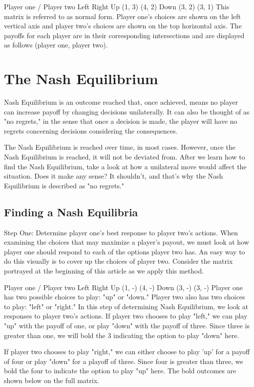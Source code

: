 Player one / Player two	Left	Right
Up	(1, 3)	(4, 2)
Down	(3, 2)	(3, 1)
This matrix is referred to as normal form. Player one's choices are shown on the left vertical axis and player two's choices are shown on the top horizontal axis. The payoffs for each player are in their corresponding intersections and are displayed as follows (player one, player two).

\section{The Nash Equilibrium}
Nash Equilibrium is an outcome reached that, once achieved, means no player can increase payoff by changing decisions unilaterally. It can also be thought of as "no regrets," in the sense that once a decision is made, the player will have no regrets concerning decisions considering the consequences.

The Nash Equilibrium is reached over time, in most cases. However, once the Nash Equilibrium is reached, it will not be deviated from. After we learn how to find the Nash Equilibrium, take a look at how a unilateral move would affect the situation. Does it make any sense? It shouldn't, and that's why the Nash Equilibrium is described as "no regrets."

\subsection{Finding a Nash Equilibria}
Step One: Determine player one's best response to player two's actions.
When examining the choices that may maximize a player's payout, we must look at how player one should respond to each of the options player two has. An easy way to do this visually is to cover up the choices of player two. Consider the matrix portrayed at the beginning of this article as we apply this method.

Player one / Player two	Left	Right
Up	(1, -)	(4, -)
Down	(3, -)	(3, -)
Player one has two possible choices to play: "up" or "down." Player two also has two choices to play: "left" or "right." In this step of determining Nash Equilibrium, we look at responses to player two's actions. If player two chooses to play "left," we can play "up" with the payoff of one, or play "down" with the payoff of three. Since three is greater than one, we will bold the 3 indicating the option to play "down" here.

If player two chooses to play "right," we can either choose to play 'up' for a payoff of four or play "down" for a playoff of three. Since four is greater than three, we bold the four to indicate the option to play "up" here. The bold outcomes are shown below on the full matrix.

